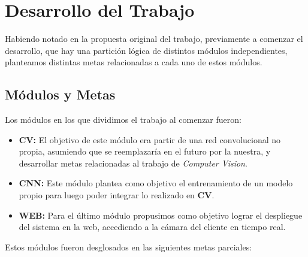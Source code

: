 \documentclass[a4paper]{article}
\begin{document}
\section{Desarrollo del Trabajo}

Habiendo notado en la propuesta original del trabajo, previamente a comenzar el desarrollo, que hay una partición lógica de distintos módulos independientes, planteamos distintas metas relacionadas a cada uno de estos módulos.

\subsection{Módulos y Metas}

Los módulos en los que dividimos el trabajo al comenzar fueron:

\begin{itemize}
    \item \textbf{CV:} El objetivo de este módulo era partir de una red convolucional no propia, asumiendo que se reemplazaría en el futuro por la nuestra, y desarrollar metas relacionadas al trabajo de \textit{Computer Vision}.

    \item \textbf{CNN:} Este módulo plantea como objetivo el entrenamiento de un modelo propio  para luego poder integrar lo realizado en \textbf{CV}.

    \item \textbf{WEB:} Para el último módulo propusimos como objetivo lograr el despliegue del sistema en la web, accediendo a la cámara del cliente en tiempo real.
\end{itemize}

Estos módulos fueron desglosados en las siguientes metas parciales:
\end{document}
